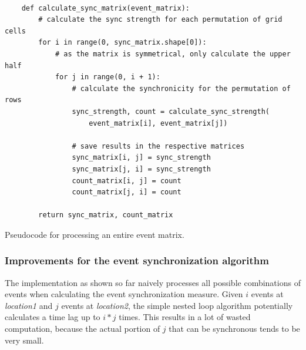 \begin{listing}[H]
  \begin{verbatim}

    def calculate_sync_matrix(event_matrix):
        # calculate the sync strength for each permutation of grid cells
        for i in range(0, sync_matrix.shape[0]):
            # as the matrix is symmetrical, only calculate the upper half
            for j in range(0, i + 1):
                # calculate the synchronicity for the permutation of rows
                sync_strength, count = calculate_sync_strength(
                    event_matrix[i], event_matrix[j])

                # save results in the respective matrices
                sync_matrix[i, j] = sync_strength
                sync_matrix[j, i] = sync_strength
                count_matrix[i, j] = count
                count_matrix[j, i] = count

        return sync_matrix, count_matrix

  \end{verbatim}
  \caption{Pseudocode for processing an entire event matrix.}
  \label{lst:sync_matrix}
\end{listing}

\subsubsection{Improvements for the event synchronization algorithm}
The implementation as shown so far naively processes all possible combinations of events when calculating the event synchronization measure. Given $i$ events at \textit{location1} and $j$ events at \textit{location2}, the simple nested loop algorithm potentially calculates a time lag up to $i * j$ times. This results in a lot of wasted computation, because the actual portion of $j$ that can be synchronous tends to be very small.

